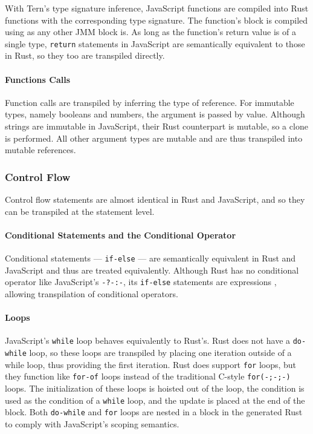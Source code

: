 \documentclass[12pt]{article}
\begin{document}
	With Tern's type signature inference, JavaScript functions are compiled into Rust functions with the corresponding type signature. The function's block is compiled using as any other JMM block is. As long as the function's return value is of a single type, \texttt{return} statements in JavaScript are semantically equivalent to those in Rust, so they too are transpiled directly. 

	\paragraph{Functions Calls} Function calls are transpiled by inferring the type of reference. For immutable types, namely booleans and numbers, the argument is passed by value. Although strings are immutable in JavaScript, their Rust counterpart is mutable, so a clone is performed. All other argument types are mutable and are thus transpiled into mutable references. 
	
	\subsubsection{Control Flow}
	
	Control flow statements are almost identical in Rust and JavaScript, and so they can be transpiled at the statement level.
	
	\paragraph{Conditional Statements and the Conditional Operator}
	
	Conditional statements --- \texttt{if-else} --- are semantically equivalent in Rust and JavaScript and thus are treated equivalently. Although Rust has no conditional operator like JavaScript's \texttt{-?-:-}, its \texttt{if-else} statements are expressions \cite{Klabnik}, allowing transpilation of conditional operators.
	
	\paragraph{Loops}
	
	JavaScript's \texttt{while} loop behaves equivalently to Rust's. Rust does not have a \texttt{do-while} loop, so these loops are transpiled by placing one iteration outside of a while loop, thus providing the first iteration. Rust does support \texttt{for} loops, but they function like \texttt{for-of} loops instead of the traditional C-style \texttt{for(-;-;-)} loops. The initialization of these loops is hoisted out of the loop, the condition is used as the condition of a \texttt{while} loop, and the update is placed at the end of the block. Both \texttt{do-while} and \texttt{for} loops are nested in a block in the generated Rust to comply with JavaScript's scoping semantics.
	
\end{document}
